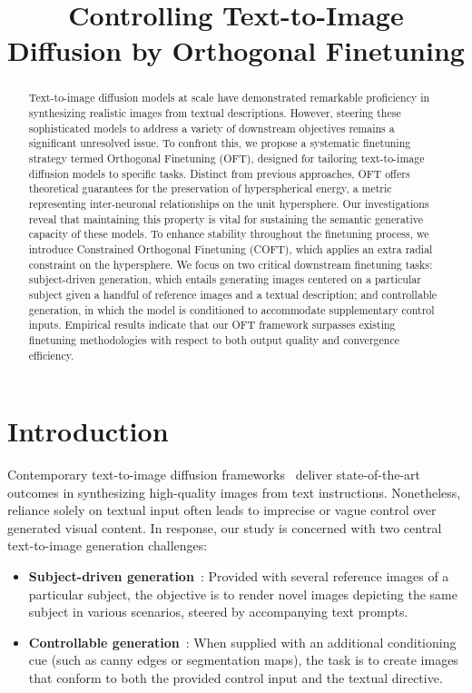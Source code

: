 \title{Controlling Text-to-Image Diffusion by Orthogonal Finetuning}

\begin{abstract}
Text-to-image diffusion models at scale have demonstrated remarkable proficiency in synthesizing realistic images from textual descriptions. However, steering these sophisticated models to address a variety of downstream objectives remains a significant unresolved issue. To confront this, we propose a systematic finetuning strategy termed Orthogonal Finetuning (OFT), designed for tailoring text-to-image diffusion models to specific tasks. Distinct from previous approaches, OFT offers theoretical guarantees for the preservation of hyperspherical energy, a metric representing inter-neuronal relationships on the unit hypersphere. Our investigations reveal that maintaining this property is vital for sustaining the semantic generative capacity of these models. To enhance stability throughout the finetuning process, we introduce Constrained Orthogonal Finetuning (COFT), which applies an extra radial constraint on the hypersphere. We focus on two critical downstream finetuning tasks: subject-driven generation, which entails generating images centered on a particular subject given a handful of reference images and a textual description; and controllable generation, in which the model is conditioned to accommodate supplementary control inputs. Empirical results indicate that our OFT framework surpasses existing finetuning methodologies with respect to both output quality and convergence efficiency.
\end{abstract}

\section{Introduction}

Contemporary text-to-image diffusion frameworks~\cite{saharia2022photorealistic,ramesh2022hierarchical,rombach2022high} deliver state-of-the-art outcomes in synthesizing high-quality images from text instructions. Nonetheless, reliance solely on textual input often leads to imprecise or vague control over generated visual content. In response, our study is concerned with two central text-to-image generation challenges:

\begin{itemize}[leftmargin=*,nosep]

    \item \textbf{Subject-driven generation}~\cite{ruiz2023dreambooth}: Provided with several reference images of a particular subject, the objective is to render novel images depicting the same subject in various scenarios, steered by accompanying text prompts.
    \item \textbf{Controllable generation}~\cite{zhang2023adding,mou2023t2i}: When supplied with an additional conditioning cue (such as canny edges or segmentation maps), the task is to create images that conform to both the provided control input and the textual directive.
\end{itemize}

